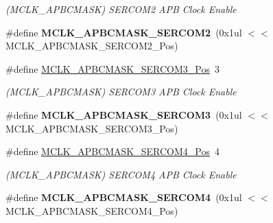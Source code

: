 \begin{DoxyCompactItemize}
\begin{DoxyCompactList}\small\item\em (M\+C\+L\+K\+\_\+\+A\+P\+B\+C\+M\+A\+S\+K) S\+E\+R\+C\+O\+M2 A\+P\+B Clock Enable \end{DoxyCompactList}\item 
\hypertarget{group___s_a_m_l21___m_c_l_k_ga36476aeaf42717c6869f54390f38c029}{}\#define {\bfseries M\+C\+L\+K\+\_\+\+A\+P\+B\+C\+M\+A\+S\+K\+\_\+\+S\+E\+R\+C\+O\+M2}~(0x1ul $<$$<$ M\+C\+L\+K\+\_\+\+A\+P\+B\+C\+M\+A\+S\+K\+\_\+\+S\+E\+R\+C\+O\+M2\+\_\+\+Pos)\label{group___s_a_m_l21___m_c_l_k_ga36476aeaf42717c6869f54390f38c029}

\item 
\hypertarget{group___s_a_m_l21___m_c_l_k_ga883809e62bbb619e191cb3308acc7c75}{}\#define \hyperlink{group___s_a_m_l21___m_c_l_k_ga883809e62bbb619e191cb3308acc7c75}{M\+C\+L\+K\+\_\+\+A\+P\+B\+C\+M\+A\+S\+K\+\_\+\+S\+E\+R\+C\+O\+M3\+\_\+\+Pos}~3\label{group___s_a_m_l21___m_c_l_k_ga883809e62bbb619e191cb3308acc7c75}

\begin{DoxyCompactList}\small\item\em (M\+C\+L\+K\+\_\+\+A\+P\+B\+C\+M\+A\+S\+K) S\+E\+R\+C\+O\+M3 A\+P\+B Clock Enable \end{DoxyCompactList}\item 
\hypertarget{group___s_a_m_l21___m_c_l_k_ga2cc259b90f507ebd23fd2c8e8a27047d}{}\#define {\bfseries M\+C\+L\+K\+\_\+\+A\+P\+B\+C\+M\+A\+S\+K\+\_\+\+S\+E\+R\+C\+O\+M3}~(0x1ul $<$$<$ M\+C\+L\+K\+\_\+\+A\+P\+B\+C\+M\+A\+S\+K\+\_\+\+S\+E\+R\+C\+O\+M3\+\_\+\+Pos)\label{group___s_a_m_l21___m_c_l_k_ga2cc259b90f507ebd23fd2c8e8a27047d}

\item 
\hypertarget{group___s_a_m_l21___m_c_l_k_ga3ee8b25a7f394c894926c0912805650e}{}\#define \hyperlink{group___s_a_m_l21___m_c_l_k_ga3ee8b25a7f394c894926c0912805650e}{M\+C\+L\+K\+\_\+\+A\+P\+B\+C\+M\+A\+S\+K\+\_\+\+S\+E\+R\+C\+O\+M4\+\_\+\+Pos}~4\label{group___s_a_m_l21___m_c_l_k_ga3ee8b25a7f394c894926c0912805650e}

\begin{DoxyCompactList}\small\item\em (M\+C\+L\+K\+\_\+\+A\+P\+B\+C\+M\+A\+S\+K) S\+E\+R\+C\+O\+M4 A\+P\+B Clock Enable \end{DoxyCompactList}\item 
\hypertarget{group___s_a_m_l21___m_c_l_k_ga98799b3c9d94cc6222398c9452a74907}{}\#define {\bfseries M\+C\+L\+K\+\_\+\+A\+P\+B\+C\+M\+A\+S\+K\+\_\+\+S\+E\+R\+C\+O\+M4}~(0x1ul $<$$<$ M\+C\+L\+K\+\_\+\+A\+P\+B\+C\+M\+A\+S\+K\+\_\+\+S\+E\+R\+C\+O\+M4\+\_\+\+Pos)\label{group___s_a_m_l21___m_c_l_k_ga98799b3c9d94cc6222398c9452a74907}


\end{DoxyCompactItemize}
